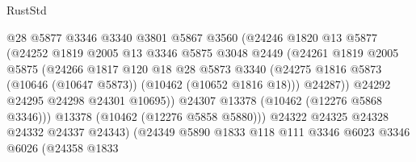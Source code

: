 \begin{lexlean}{RustStd}
\begin{coremodule}
                                @28
                                @5877
                                @3346
                                @3340
                                @3801
                                @5867
                                @3560
                                (@24246
                                  @1820
                                  @13
                                  @5877
                                  (@24252
                                    @1819
                                    @2005
                                    @13
                                    @3346
                                    @5875
                                    @3048
                                    @2449
                                    (@24261
                                      @1819
                                      @2005
                                      @5875
                                      (@24266
                                        @1817
                                        @120
                                        @18
                                        @28
                                        @5873
                                        @3340
                                        (@24275
                                          @1816
                                          @5873
                                          (@10646 (@10647 @5873))
                                          (@10462 (@10652 @1816 @18)))
                                        @24287))
                                    @24292
                                    @24295
                                    @24298
                                    @24301
                                    @10695))
                                @24307
                                @13378
                                (@10462 (@12276 @5868 @3346)))
                              @13378
                              (@10462 (@12276 @5858 @5880)))
                            @24322
                            @24325
                            @24328
                            @24332
                            @24337
                            @24343)
                          (@24349
                            @5890
                            @1833
                            @118
                            @111
                            @3346
                            @6023
                            @3346
                            @6026
                            (@24358
                              @1833

\end{coremodule}
\end{lexlean}
